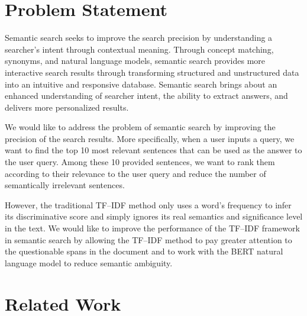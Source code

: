 \section{Problem Statement} \label{sec:problem-statement}
Semantic search seeks to improve the search precision by understanding a searcher's intent through contextual meaning. Through concept matching, synonyms, and natural language models, semantic search provides more interactive search results through transforming structured and unstructured data into an intuitive and responsive database. Semantic search brings about an enhanced understanding of searcher intent, the ability to extract answers, and delivers more personalized results.

We would like to address the problem of semantic search by improving the precision of the search results. More specifically, when a user inputs a query, we want to find the top 10 most relevant sentences that can be used as the answer to the user query. Among these 10 provided sentences, we want to rank them according to their relevance to the user query and reduce the number of semantically irrelevant sentences.

However, the traditional TF--IDF method only uses a word's frequency to infer its discriminative score and simply ignores its real semantics and significance level in the text. We would like to improve the performance of the TF--IDF framework in semantic search by allowing the TF--IDF method to pay greater attention to the questionable spans in the document and to work with the BERT natural language model to reduce semantic ambiguity.

\section{Related Work} \label{sec:related-work}

